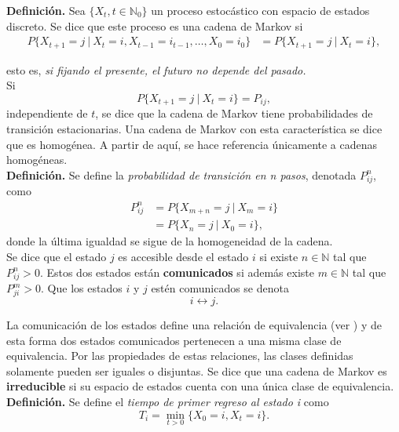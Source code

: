\documentclass[11pt,a4paper]{article}
\begin{document}
\textbf{Definición.} Sea $\lbrace X_t, t \in \mathbb{N}_0\rbrace$ un proceso estocástico con espacio de estados discreto. Se dice que este proceso es una cadena de Markov si 
\begin{align*}
P\lbrace X_{t+1} = j \ | \ X_t = i, X_{t-1} = i_{t-1}, \dots, X_0 = i_0\rbrace &= P\lbrace X_{t+1} = j \ | \ X_t = i\rbrace,
\end{align*}

esto es, \textit{si fijando el presente, el futuro no depende del pasado.}\\

Si $$P\lbrace X_{t+1} = j \ | \ X_t = i\rbrace = P_{ij},$$ independiente de $t$, se dice que la cadena de Markov tiene probabilidades de transición estacionarias. Una cadena de Markov con esta característica se dice que es homogénea. A partir de aquí, se hace referencia únicamente a cadenas homogéneas.\\

\textbf{Definición.} Se define la \textit{probabilidad de transición en n pasos}, denotada $P_{ij}^n$, como
\begin{align*}
P_{ij}^n &= P\lbrace X_{m+n} = j \ | \ X_{m} = i\rbrace\\
&= P\lbrace X_n = j \ | \ X_0 = i \rbrace,
\end{align*}
donde la última igualdad se sigue de la homogeneidad de la cadena.\\

Se dice que el estado $j$ es accesible desde el estado $i$ si existe $n \in \mathbb{N}$ tal que $P_{ij}^n > 0$. Estos dos estados están \textbf{comunicados} si además existe $m \in \mathbb{N}$ tal que $P_{ji}^m > 0$. Que los estados $i$ y $j$ estén comunicados se denota
\begin{equation} \label{clase_eq}
i \leftrightarrow j.
\end{equation}

La comunicación de los estados define una relación de equivalencia (ver \citet{ross}) y de esta forma dos estados comunicados pertenecen a una misma clase de equivalencia. Por las propiedades de estas relaciones, las clases definidas solamente pueden ser iguales o disjuntas. Se dice que una cadena de Markov es \textbf{irreducible} si su espacio de estados cuenta con una única clase de equivalencia.\\

\textbf{Definición.} Se define el \textit{tiempo de primer regreso al estado i} como $$T_i = \min_{t>0} \lbrace X_0 = i, X_t = i \rbrace.$$\\
\end{document}
